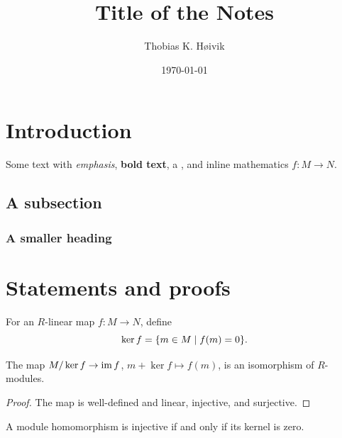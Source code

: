 \documentclass[11pt]{article}
\title{Title of the Notes}
\author{Thobias K. H\o ivik}
\date{\today} %
\begin{document}
\maketitle

\section{Introduction}\label{sec:intro}
Some text with \emph{emphasis}, \textbf{bold text}, a
, and inline mathematics \(f:M\to N\).

\subsection{A subsection}
\subsubsection{A smaller heading}

\section{Statements and proofs}
\begin{definition}[Kernel]\label{definition:kernel}
For an \(R\)-linear map \(f:M\to N\), define
\[
    \ker f=\lbrace m\in M\mid f(m)=0\rbrace.
\]
\end{definition}

\begin{thm}\label{thm:first}
The map \(M/\ker f\to\operatorname{im} f\), \(m+\ker f\mapsto f(m)\),
is an isomorphism of \(R\)-modules.
\end{thm}
\begin{proof}
The map is well-defined and linear, injective, and surjective.
\end{proof}

\begin{lem}\label{lem:kernel}
A module homomorphism is injective if and only if its kernel is zero.
\end{lem}
\end{document}
